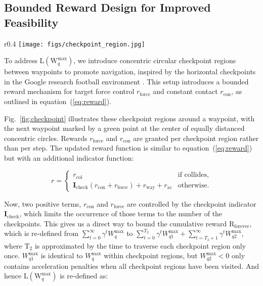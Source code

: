 \subsection{Bounded Reward Design for Improved Feasibility} \label{sec:bounded-reward-design}

 

\begin{wrapfigure}{r}{0.4\linewidth}
  \centering
  \texttt{[image: figs/checkpoint\_region.jpg]}
  \caption{Illustration of Checkpoint Regions.}
  \label{fig:checkpoint}
  \vspace{-1em}
\end{wrapfigure}

To address $\text{L}(\text{W}_q^{\text{max}})$, we introduce concentric circular checkpoint regions between waypoints to promote navigation, inspired by the horizontal checkpoints in the Google research football environment \cite{kurach2020google}. This setup introduces a bounded reward mechanism for target force control $r_{\text{force}}$ and constant contact $r_{\text{con}}$, as outlined in equation~(\ref{eq:reward}). %

Fig.~\ref{fig:checkpoint} illustrates these checkpoint regions around a waypoint, with the next waypoint marked by a green point at the center of equally distanced concentric circles. Rewards $r_{\text{force}}$ and $r_{\text{con}}$ are granted per checkpoint region rather than per step. The updated reward function is similar to equation~(\ref{eq:reward}) but with an additional indicator function:













\begin{equation}
r = 
\begin{cases} 
r_{\text{col}} & \text{if collides} , \\
\mathbf{I}_{\text{check}} (r_{\text{con}} + r_{\text{force}}) + r_{\text{way}} + r_{\text{ac}} & \text{otherwise}.
\end{cases}
\label{eq:reward1}
\end{equation}

Now, two positive terms, $r_{\text{con}}$ and $r_{\text{force}}$ are controlled by the checkpoint indicator $\mathbf{I}_{\text{check}}$, which limits the occurrence of those terms to the number of the checkpoints. This gives us a direct way to bound the cumulative reward $\text{R}_\text{forever}$, which is re-defined from  $\sum_{t=0}^{\infty} \gamma^t W_q^{\text{max}}$ to  $\sum_{t=0}^{T_2} \gamma^t W_{q1}^{\text{max}} + \sum_{t={T_2+1}}^{\infty} \gamma^t W_{q2}^{\text{max}}$, where $\text{T}_2$ is approximated by the time to traverse each checkpoint region only once. $W_{q1}^{\text{max}}$ is identical to $W_{q}^{\text{max}}$ within checkpoint regions, but $W_{q2}^{\text{max}} < 0$ only contains acceleration penalties when all checkpoint regions have been visited. And hence $\text{L}(\text{W}_q^{\text{max}})$ is re-defined as: 

